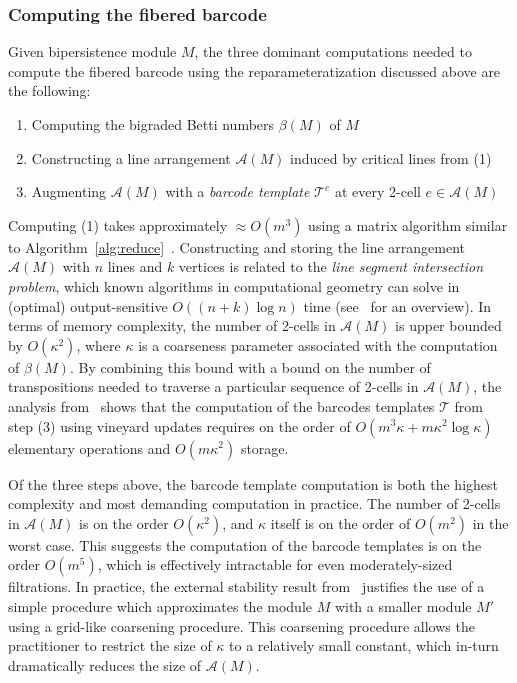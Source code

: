 \documentclass{article} %
\newcommand\sbullet[1][.5]{\mathbin{\vcenter{\hbox{\scalebox{#1}{$\bullet$}}}}}
\begin{document}
\subsubsection*{Computing the fibered barcode}
Given bipersistence module $M$, the three dominant computations needed to compute the fibered barcode using the reparameteratization discussed above are the following: 
\begin{enumerate}
	\item Computing the bigraded Betti numbers $\beta(M)$ of $M$
	\item Constructing a line arrangement $\mathcal{A}(M)$ induced by critical lines from (1) 
	\item Augmenting $\mathcal{A}(M)$ with a \emph{barcode template} $\mathcal{T}^e$ at every 2-cell $e \in \mathcal{A}(M)$
\end{enumerate}
Computing (1) takes approximately $\approx O(m^3)$ using a matrix algorithm similar to Algorithm~\ref{alg:reduce}~\cite{lesnick2019computing}. Constructing and storing the line arrangement $\mathcal{A}(M)$ with $n$ lines and $k$ vertices is related to the \emph{line segment intersection problem}, which known algorithms in computational geometry can solve in (optimal) output-sensitive $O((n+k) \log n)$ time (see~\cite{boissonnat2000robust} for an overview). In terms of memory complexity, the number of 2-cells in $\mathcal{A}(M)$ is upper bounded by $O(\kappa^2)$, where $\kappa$ is a coarseness parameter associated with the computation of $\beta(M)$. 
By combining this bound with a bound on the number of transpositions needed to traverse a particular sequence of 2-cells in $\mathcal{A}(M)$, the analysis from~\cite{lesnick2015interactive} shows that the computation of the barcodes templates $\mathcal{T}$ from step (3) using vineyard updates requires on the order of $O(m^3 \kappa + m \kappa^2 \log \kappa)$ elementary operations and $O(m \kappa^2)$ storage. 

Of the three steps above, the barcode template computation is both the highest complexity and most demanding computation in practice. The number of 2-cells in $\mathcal{A}(M)$ is on the order $O(\kappa^2)$, and $\kappa$ itself is on the order of $O(m^2)$ in the worst case. 
This suggests the computation of the barcode templates is on the order $O(m^5)$, which is effectively intractable for even moderately-sized filtrations. In practice, the external stability result from~\cite{landi2014rank} justifies the use of a simple procedure which approximates the module $M$ with a smaller module $M'$ using a grid-like coarsening procedure. This coarsening procedure allows the practitioner to restrict the size of $\kappa$ to a relatively small constant, which in-turn dramatically reduces the size of $\mathcal{A}(M)$. 
\end{document}
